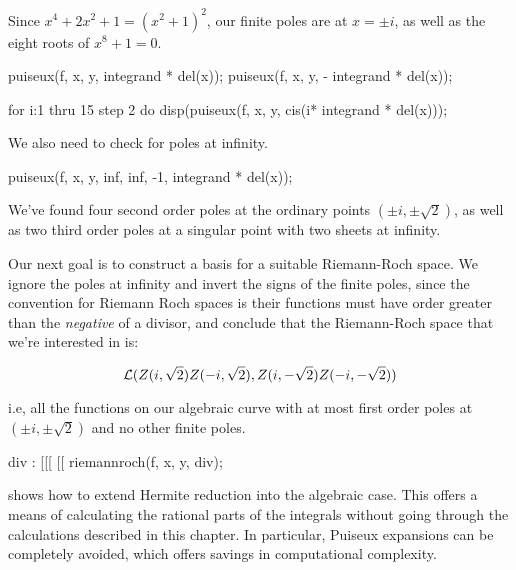 Since $x^4+2x^2+1=(x^2+1)^2$, our finite poles are at $x=\pm i$,
as well as the eight roots of $x^8+1=0$.

\begin{maximablock}
puiseux(f, x, y, %
        integrand * del(x));
puiseux(f, x, y, -%
        integrand * del(x));
\end{maximablock}
\begin{maximablocksmall}
for i:1 thru 15 step 2 do
   disp(puiseux(f, x, y, cis(i*%
                integrand * del(x)));
\end{maximablocksmall}

We also need to check for poles at infinity.

\begin{maximablock}
puiseux(f, x, y, inf, inf, -1,
        integrand * del(x));
\end{maximablock}

We've found four second order poles at the ordinary points $(\pm i, \pm\sqrt{2})$,
as well as two third order poles at a singular point with two sheets at infinity.

Our next goal is to construct a basis for a suitable Riemann-Roch space.
We ignore the poles at infinity and invert the signs of the finite poles,
since the convention for Riemann Roch spaces is their functions must
have order greater than the {\it negative} of a divisor, and conclude
that the Riemann-Roch space that we're interested in is:

$${\cal L}(Z(i, \sqrt{2}) Z(-i, \sqrt{2}), Z(i, -\sqrt{2}) Z(-i, -\sqrt{2}))$$

i.e, all the functions on our algebraic curve with at most first order
poles at $(\pm i,\pm\sqrt{2})$ and no other finite poles.

\begin{maximablock}
div : [[[%
       [[%
riemannroch(f, x, y, div);
\end{maximablock}



\endexample

\vfill\eject
{}

\cite{trager} shows how to extend Hermite reduction into the algebraic case.
This offers a means of calculating the rational parts of the integrals
without going through the calculations described in this chapter.  In
particular, Puiseux expansions can be completely avoided, which offers
savings in computational complexity.
